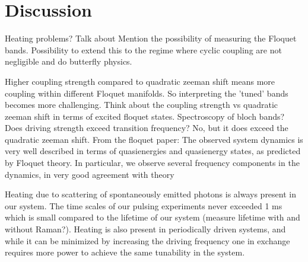 \section{Discussion}

Heating problems? Talk about  Mention the possibility of measuring the Floquet bands. Possibility to extend this to the regime where cyclic coupling are not negligible and do butterfly physics.


Higher coupling strength compared to quadratic zeeman shift means more coupling within different Floquet manifolds. So interpreting the 'tuned' bands becomes more challenging.
Think about the coupling strength vs quadratic zeeman shift in terms of excited floquet states. 
Spectroscopy of bloch bands?
Does driving strength exceed transition frequency? No, but it does exceed the quadratic zeeman shift. 
From the floquet paper: The observed  system dynamics is very well described in terms of
quasienergies and quasienergy states, as predicted by
Floquet theory. In particular, we observe several frequency
components in the dynamics, in very good agreement with
theory

Heating due to scattering of spontaneously emitted photons is always present in our system. The time scales of our pulsing experiments never exceeded 1 ms which is small compared to the lifetime of our system (measure lifetime with and without Raman?). Heating is also present in periodically driven systems, and while it can be minimized by increasing the driving frequency one in exchange requires more power to achieve the same tunability in the system. 